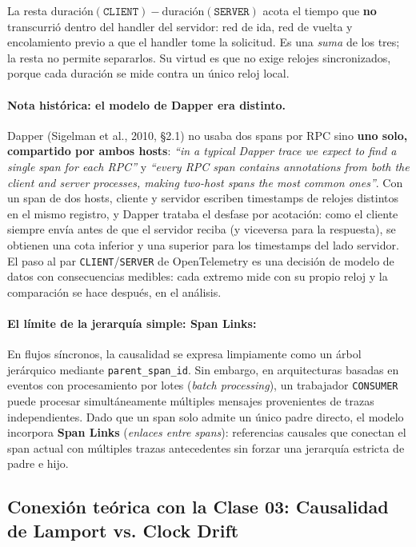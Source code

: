 \documentclass[variant=apuntes,cover=institutional,mode=screen]{ua-engineering-v6-article}
\begin{document}
La resta $\text{duración}(\texttt{CLIENT}) - \text{duración}(\texttt{SERVER})$ acota el tiempo que \textbf{no} transcurrió dentro del handler del servidor: red de ida, red de vuelta y encolamiento previo a que el handler tome la solicitud. Es una \emph{suma} de los tres; la resta no permite separarlos. Su virtud es que no exige relojes sincronizados, porque cada duración se mide contra un único reloj local.

\paragraph{Nota histórica: el modelo de Dapper era distinto.}
Dapper (Sigelman et al., 2010, \S2.1) no usaba dos spans por RPC sino \textbf{uno solo, compartido por ambos hosts}: \emph{``in a typical Dapper trace we expect to find a single span for each RPC''} y \emph{``every RPC span contains annotations from both the client and server processes, making two-host spans the most common ones''}. Con un span de dos hosts, cliente y servidor escriben timestamps de relojes distintos en el mismo registro, y Dapper trataba el desfase por acotación: como el cliente siempre envía antes de que el servidor reciba (y viceversa para la respuesta), se obtienen una cota inferior y una superior para los timestamps del lado servidor. El paso al par \texttt{CLIENT}/\texttt{SERVER} de OpenTelemetry es una decisión de modelo de datos con consecuencias medibles: cada extremo mide con su propio reloj y la comparación se hace después, en el análisis.

\paragraph{El límite de la jerarquía simple: Span Links:}
En flujos síncronos, la causalidad se expresa limpiamente como un árbol jerárquico mediante \texttt{parent\_span\_id}. Sin embargo, en arquitecturas basadas en eventos con procesamiento por lotes (\emph{batch processing}), un trabajador \texttt{CONSUMER} puede procesar simultáneamente múltiples mensajes provenientes de trazas independientes. Dado que un span solo admite un único padre directo, el modelo incorpora \textbf{Span Links} (\emph{enlaces entre spans}): referencias causales que conectan el span actual con múltiples trazas antecedentes sin forzar una jerarquía estricta de padre e hijo.

\subsection{Conexión teórica con la Clase 03: Causalidad de Lamport vs. Clock Drift}
\end{document}
